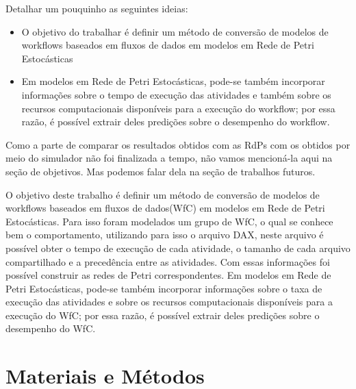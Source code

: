 \documentclass[a4paper,10pt]{article}
\begin{document}
Detalhar um pouquinho as seguintes ideias:
\begin{itemize}
	
	\item O objetivo do trabalhar é definir um método de conversão de modelos de workflows baseados em fluxos de dados em modelos em Rede de Petri Estocásticas

	\item Em modelos em Rede de Petri Estocásticas, pode-se também incorporar informações sobre o tempo de execução das atividades e também sobre os recursos computacionais disponíveis para a execução do workflow; por essa razão, é possível extrair deles predições sobre o desempenho do workflow.

\end{itemize}

Como a parte de comparar os resultados obtidos com as RdPs com os obtidos por meio do simulador não foi finalizada a tempo, não vamos mencioná-la aqui na seção de objetivos. Mas podemos falar dela na seção de trabalhos futuros.



O objetivo deste trabalho é definir um método de conversão de modelos de workflows baseados em fluxos de dados(WfC) em modelos em Rede de Petri Estocásticas. Para isso foram modelados um grupo de WfC, o qual se conhece bem o comportamento, utilizando para isso o arquivo DAX, neste arquivo é possível obter o tempo de execução de cada atividade, o tamanho de cada arquivo compartilhado e a precedência entre as atividades. Com essas informações foi possível construir as redes de Petri correspondentes. Em modelos em Rede de Petri Estocásticas, pode-se também incorporar informações sobre o taxa de execução das atividades e sobre os recursos computacionais disponíveis para a execução do WfC; por essa razão, é possível extrair deles predições sobre o desempenho do WfC.


\section*{Materiais e Métodos}
\end{document}
